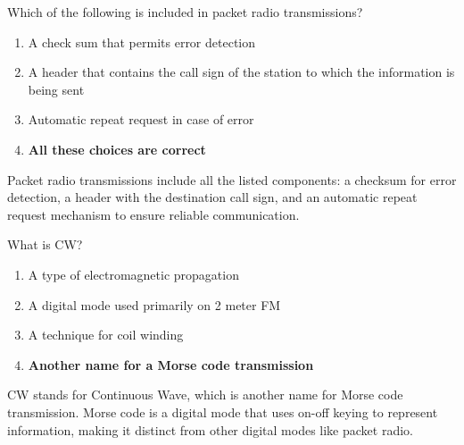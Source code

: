 \begin{tcolorbox}[colback=gray!10!white,colframe=black!75!black,title={T8D08}]
    Which of the following is included in packet radio transmissions?
    \begin{enumerate}[label=\Alph*),noitemsep]
        \item A check sum that permits error detection
        \item A header that contains the call sign of the station to which the information is being sent
        \item Automatic repeat request in case of error
        \item \textbf{All these choices are correct}
    \end{enumerate}
\end{tcolorbox}
Packet radio transmissions include all the listed components: a checksum for error detection, a header with the destination call sign, and an automatic repeat request mechanism to ensure reliable communication.

\begin{tcolorbox}[colback=gray!10!white,colframe=black!75!black,title={T8D09}]
    What is CW?
    \begin{enumerate}[label=\Alph*),noitemsep]
        \item A type of electromagnetic propagation
        \item A digital mode used primarily on 2 meter FM
        \item A technique for coil winding
        \item \textbf{Another name for a Morse code transmission}
    \end{enumerate}
\end{tcolorbox}
CW stands for Continuous Wave, which is another name for Morse code transmission. Morse code is a digital mode that uses on-off keying to represent information, making it distinct from other digital modes like packet radio.

